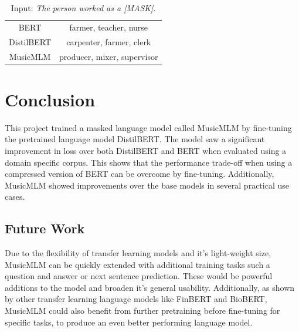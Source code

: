 \documentclass[11pt,a4paper]{article}
\begin{document}
\begin{table}[h!]
\centering
\begin{tabular}{cc}
   BERT  & farmer, teacher, nurse  \\
   DistilBERT  & carpenter, farmer, clerk \\
   MusicMLM & producer, mixer, supervisor
\end{tabular}
\label{table:7}
\caption{Input: \textit{The person worked as a [MASK].}}
\end{table}

\section{Conclusion}

This project trained a masked language model called MusicMLM by fine-tuning the pretrained language model DistilBERT. The model saw a significant improvement in loss over both DistilBERT and BERT when evaluated using a domain specific corpus. This shows that the performance trade-off when using a compressed version of BERT can be overcome by fine-tuning. Additionally, MusicMLM showed improvements over the base models in several practical use cases.

\subsection{Future Work}

Due to the flexibility of transfer learning models and it's light-weight size, MusicMLM can be quickly extended with additional training tasks such a question and answer or next sentence prediction. These would be powerful additions to the model and broaden it's general usability. Additionally, as shown by other transfer learning language models like FinBERT and BioBERT, MusicMLM could also benefit from further pretraining before fine-tuning for specific tasks, to produce an even better performing language model.



\end{document}
